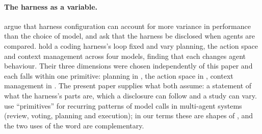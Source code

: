 \paragraph{The harness as a variable.} \citet{zhang2026stop} argue that harness configuration can account for more variance in performance than the choice of model, and ask that the harness be disclosed when agents are compared. \citet{fan2026empirical} hold a coding harness's loop fixed and vary planning, the action space and context management across four models, finding that each changes agent behaviour. Their three dimensions were chosen independently of this paper and each falls within one primitive: planning in , the action space in , context management in . The present paper supplies what both assume: a statement of what the harness's parts are, which a disclosure can follow and a study can vary. \citet{jin2026agentprimitives} use ``primitives'' for recurring patterns of model calls in multi-agent systems (review, voting, planning and execution); in our terms these are shapes of , and the two uses of the word are complementary.
